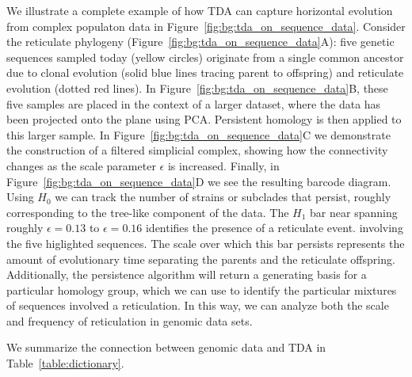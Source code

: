 We illustrate a complete example of how TDA can capture horizontal evolution from complex populaton data in Figure~\ref{fig:bg:tda_on_sequence_data}.
Consider the reticulate phylogeny (Figure~\ref{fig:bg:tda_on_sequence_data}A): five genetic sequences sampled today (yellow circles) originate from a single common ancestor due to clonal evolution (solid blue lines tracing parent to offspring) and reticulate evolution (dotted red lines).
In Figure~\ref{fig:bg:tda_on_sequence_data}B, these five samples are placed in the context of a larger dataset, where the data has been projected onto the plane using PCA.
Persistent homology is then applied to this larger sample.
In Figure~\ref{fig:bg:tda_on_sequence_data}C we demonstrate the construction of a filtered simplicial complex, showing how the connectivity changes as the scale parameter $\epsilon$ is increased.
Finally, in Figure~\ref{fig:bg:tda_on_sequence_data}D we see the resulting barcode diagram.
Using $H_0$ we can track the number of strains or subclades that persist, roughly corresponding to the tree-like component of the data.
The $H_1$ bar near spanning roughly $\epsilon=0.13$ to $\epsilon=0.16$ identifies the presence of a reticulate event. involving the five higlighted sequences.
The scale over which this bar persists represents the amount of evolutionary time separating the parents and the reticulate offspring.
Additionally, the persistence algorithm will return a generating basis for a particular homology group, which we can use to identify the particular mixtures of sequences involved a reticulation.
In this way, we can analyze both the scale and frequency of reticulation in genomic data sets.

We summarize the connection between genomic data and TDA in Table~\ref{table:dictionary}.

